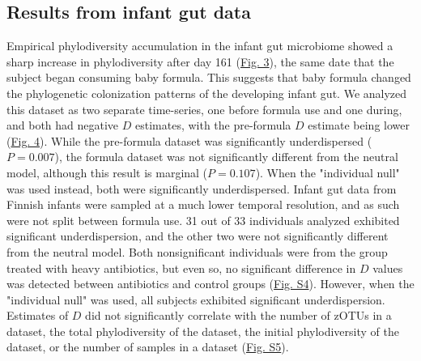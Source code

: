 \documentclass{article}
\begin{document}
\subsection{Results from infant gut data}
Empirical phylodiversity accumulation in the infant gut microbiome \cite{Koenig2011} showed a sharp increase in phylodiversity after day 161 (\hyperref[sec:figure3]{Fig. 3}), the same date that the subject began consuming baby formula. This suggests that baby formula changed the phylogenetic colonization patterns of the developing infant gut. We analyzed this dataset as two separate time-series, one before formula use and one during, and both had negative \(D\) estimates, with the pre-formula \(D\) estimate being lower (\hyperref[sec:figure4]{Fig. 4}). While the pre-formula dataset was significantly underdispersed (\(P = 0.007\)), the formula dataset was not significantly different from the neutral model, although this result is marginal (\(P = 0.107\)). When the "individual null" was used instead, both were significantly underdispersed. Infant gut data from Finnish infants \cite{Yassour2016} were sampled at a much lower temporal resolution, and as such were not split between formula use. 31 out of 33 individuals analyzed exhibited significant underdispersion, and the other two were not significantly different from the neutral model. Both nonsignificant individuals were from the group treated with heavy antibiotics, but even so, no significant difference in \(D\) values was detected between antibiotics and control groups (\hyperref[sec:figureS4]{Fig. S4}). However, when the "individual null" was used, all subjects exhibited significant underdispersion. Estimates of \(D\) did not significantly correlate with the number of zOTUs in a dataset, the total phylodiversity of the dataset, the initial phylodiversity of the dataset, or the number of samples in a dataset (\hyperref[sec:figureS5]{Fig. S5}). 


\end{document}
